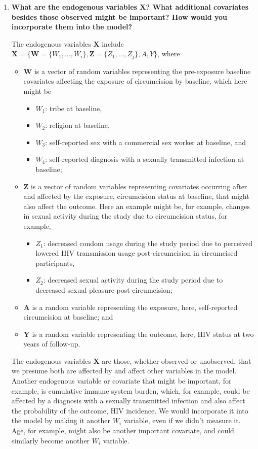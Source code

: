 \documentclass{article}
\begin{document}
\begin{enumerate}[label=\textbf{(\alph*)}]

  \item \textbf{What are the endogenous variables $\bm{X}$? What additional covariates besides those observed might be important? How would you incorporate them into the model?}
  
  The endogenous variables $\bm{X}$ include $\bm{X} = \{\bm{W} = \{W_1, \dots, W_i \}, \bm{Z} = \{Z_1, \dots, Z_j \}, A, Y\}$, where
  \begin{itemize}
    \item $\bm{W}$ is a vector of random variables representing the pre-exposure baseline covariates affecting the exposure of circumcision by baseline, which here might be
    \begin{itemize}
      \item $W_1$: tribe at baseline,
      \item $W_2$: religion at baseline,
      \item $W_3$: self-reported sex with a commercial sex worker at baseline, and
      \item $W_4$: self-reported diagnosis with a sexually transmitted infection at baseline;
    \end{itemize}
    \item $\bm{Z}$ is a vector of random variables representing covariates occurring after and affected by the exposure, circumcision status at baseline, that might also affect the outcome. Here an example might be, for example, changes in sexual activity during the study due to circumcision status, for example,
    \begin{itemize}
      \item $Z_1$: decreased condom usage during the study period due to perceived lowered HIV transmission usage post-circumcision in circumcised participants,
      \item $Z_2$: decreased sexual activity during the study period due to decreased sexual pleasure post-circumcision;
    \end{itemize}
    \item $\bm{A}$ is a random variable representing the exposure, here, self-reported circumcision at baseline; and
    \item $\bm{Y}$ is a random variable representing the outcome, here, HIV status at two years of follow-up.
  \end{itemize}
  
  The endogenous variables $\bm{X}$ are those, whether observed or unobserved, that we presume both are affected by and affect other variables in the model. Another endogenous variable or covariate that might be important, for example, is cumulative immune system burden, which, for example, could be affected by a diagnosis with a sexually transmitted infection and also affect the probability of the outcome, HIV incidence. We would incorporate it into the model by making it another $W_i$ variable, even if we didn't measure it.  Age, for example, might also be another important covariate, and could similarly become another $W_i$ variable.
  

\end{enumerate}
\end{document}
